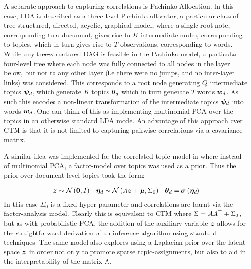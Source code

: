 A separate approach to capturing correlations is Pachinko Allocation\cite{Li2006}. In this case, LDA is described as a three level Pachinko allocator, a particular class of tree-structured, directed, acyclic, graphical model, where a single root note, corresponding to a document, gives rise to $K$ intermediate nodes, corresponding to topics, which in turn gives rise to $T$ observations, corresponding to words. While any tree-structured DAG is feasible in the Pachinko model, a particular four-level tree where each node was fully connected to all nodes in the layer below, but not to any other layer (i.e there were no jumps, and no inter-layer links) was considered. This corresponds to a root node generating $Q$ intermediate topics $\bm \psi_d$, which generate $K$ topics ${ \bm \theta_d }$ which in turn generate $T$ words ${ \bm w_d }$. As such this encodes a non-linear transformation of the intermediate topics $\bm \psi_d$ into words ${ \bm w_d }$. One can think of this as implementing multinomial PCA over the topics in an otherwise standard LDA mode. An advantage of this approach over CTM is that it is not limited to capturing pairwise correlations via a covariance matrix.

A similar idea was implemented for the correlated topic-model in \cite{Putthividhya2009} where instead of multinomial PCA, a factor-model over topics was used as a prior. Thus the prior over document-level topics took the form:

\begin{align}
\bm z & \sim \mathcal{N} \left( {\bm 0}, {I} \right) & \bm \eta_d & \sim \mathcal{N} \left( {A\bm z + \bm \mu}, {\Sigma_0} \right) & { \bm \theta_d } = \bm \sigma\left(\bm \eta_d\right) 
\end{align}
In this case $\Sigma_0$ is a fixed hyper-parameter and correlations are learnt via the factor-analysis model. Clearly this is equivalent to CTM where $\Sigma = AA^\top + \Sigma_0$, but as with probabilistic PCA, the addition of the auxiliary variable $\bm z$ allows for the straightforward derivation of an inference algorithm using standard techniques. The same model also explores using a Laplacian prior over the latent space $\bm z$ in order not only to promote sparse topic-assignments, but also to aid in the interpretability of the matrix A.



